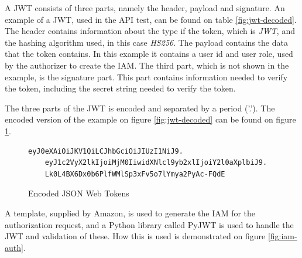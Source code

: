 A JWT consists of three parts, namely the header, payload and signature. An example of a JWT, used in the API test, can be found on table \ref{fig:jwt-decoded}. The header contains information about the type if the token, which is \textit{JWT}, and the hashing algorithm used, in this case \textit{HS256}. The payload contains the data that the token contains. In this example it contains a user id and user role, used by the authorizer to create the IAM. The third part, which is not shown in the example, is the signature part. This part contains information needed to verify the token, including the secret string needed to verify the token.

The three parts of the JWT is encoded and separated by a period  ('.'). The encoded version of the example on figure \ref{fig:jwt-decoded} can be found on figure \ref{fig:jwt-encoded}.

\begin{figure}[H]
    \centering
    \begin{lstlisting}[language=Python]
    eyJ0eXAiOiJKV1QiLCJhbGciOiJIUzI1NiJ9.
    eyJ1c2VyX2lkIjoiMjM0IiwidXNlcl9yb2xlIjoiY2l0aXplbiJ9.
    Lk0L4BX6Dx0b6PlfWMlSp3xFv5o7lYmya2PyAc-FQdE
\end{lstlisting}
    \caption{Encoded JSON Web Tokens}
    \label{fig:jwt-encoded}
\end{figure}

A template, supplied by Amazon, is used to generate the IAM for the authorization request, and a Python library called PyJWT is used to handle the JWT and validation of these. How this is used is demonstrated on figure \ref{fig:iam-auth}.


